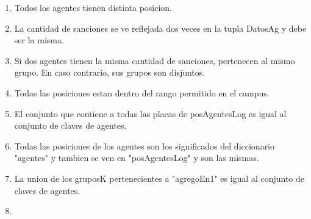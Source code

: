\hspace*{\disSubSubSecMargen}
\begin{enumerate}
\setlength{\itemindent}{3em}
  \item Todos los agentes tienen distinta posicion.
  \item La cantidad de sanciones se ve reflejada dos veces en la tupla DatosAg y debe ser la misma.
  \item Si dos agentes tienen la misma cantidad de sanciones, pertenecen al mismo grupo. En caso contrario, sus grupos son disjuntos.
  \item Todas las posiciones estan dentro del rango permitido en el campus.
  \item El conjunto que contiene a todas las placas de posAgentesLog es igual al conjunto de claves de agentes. 
  \item Todas las posiciones de los agentes son los significados del diccionario "agentes" y tambien se ven en "posAgentesLog" y son las mismas.
  \item La union de los gruposK pertenecientes a "agregoEn1" es igual al conjunto de claves de agentes.
  \item 
\end{enumerate}

